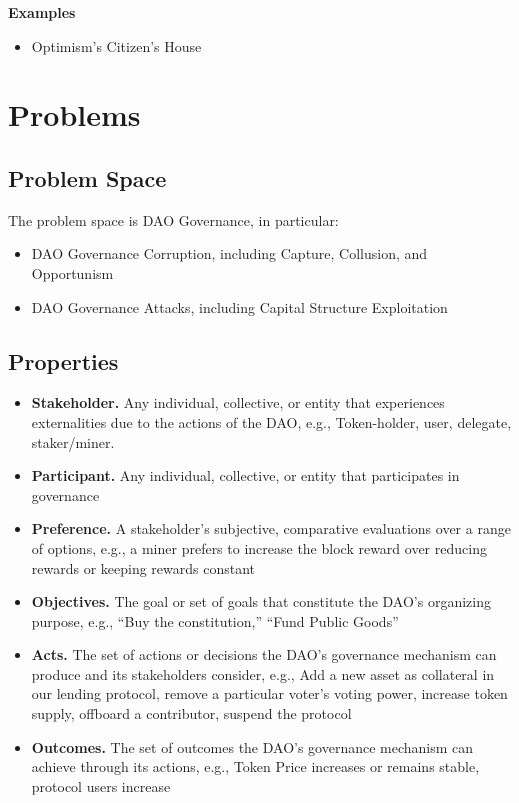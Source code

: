 \documentclass[
]{article}
\providecommand{\tightlist}{%
  \setlength{\itemsep}{0pt}\setlength{\parskip}{0pt}}
\begin{document}
\textbf{Examples}

\begin{itemize}
\tightlist
\item
  Optimism's Citizen's House
\end{itemize}
\hypertarget{problems}{%
\section{Problems}\label{problems}}

\hypertarget{problem-space}{%
\subsection{Problem Space}\label{problem-space}}

The problem space is DAO Governance, in particular:

\begin{itemize}
\tightlist
\item
  DAO Governance Corruption, including Capture, Collusion, and
  Opportunism
\item
  DAO Governance Attacks, including Capital Structure Exploitation
\end{itemize}

\hypertarget{properties}{%
\subsection{Properties}\label{properties}}

\begin{itemize}
\tightlist
\item
  \textbf{Stakeholder.} Any individual, collective, or entity that
  experiences externalities due to the actions of the DAO, e.g.,
  Token-holder, user, delegate, staker/miner.
\item
  \textbf{Participant.} Any individual, collective, or entity that
  participates in governance
\item
  \textbf{Preference.} A stakeholder's subjective, comparative
  evaluations over a range of options, e.g., a miner prefers to increase
  the block reward over reducing rewards or keeping rewards constant
\item
  \textbf{Objectives.} The goal or set of goals that constitute the
  DAO's organizing purpose, e.g., ``Buy the constitution,'' ``Fund
  Public Goods''
\item
  \textbf{Acts.} The set of actions or decisions the DAO's governance
  mechanism can produce and its stakeholders consider, e.g., Add a new
  asset as collateral in our lending protocol, remove a particular
  voter's voting power, increase token supply, offboard a contributor,
  suspend the protocol
\item
  \textbf{Outcomes.} The set of outcomes the DAO's governance mechanism
  can achieve through its actions, e.g., Token Price increases or
  remains stable, protocol users increase
\end{itemize}
\end{document}
